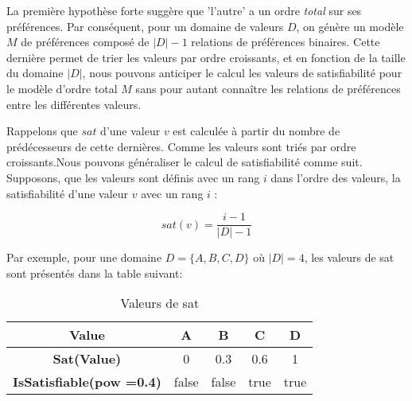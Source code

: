 \documentclass{llncs}
\begin{document}
	La première hypothèse forte suggère que 'l'autre' a un ordre \emph{total} sur ses préférences. Par conséquent, pour un domaine de valeurs $D$, on génère un modèle $M$ de préférences composé de $|D| -1$ relations de préférences binaires. Cette dernière permet de trier les valeurs par ordre croissants, et en fonction de la taille du domaine $|D|$, nous pouvons anticiper le calcul les valeurs de satisfiabilité pour le modèle d'ordre total $M$ sans pour autant connaître les relations de préférences entre les différentes valeurs.
	
	Rappelons que $sat$ d'une valeur $v$ est calculée à partir du nombre de prédécesseurs de cette dernières. Comme les valeurs sont triés par ordre croissants.Nous pouvons généraliser le calcul de satisfiabilité comme suit. Supposons, que les valeurs sont définis avec un rang $i$ dans l'ordre des valeurs, la satisfiabilité d'une valeur $v$ avec un rang $i$ :
	
	\begin{equation}
		sat(v) = \frac{i-1}{|D|-1}
	\end{equation} 
	
	Par exemple, pour une domaine $D =\{A, B, C, D\}$ où $|D| = 4$, les valeurs de sat sont présentés dans la table suivant: 
	
		\begin{table}[h]
			\centering
			\begin{tabular}{ |c|c|c|c|c| }
				\hline
				\textbf{Value}& \textbf{A} & \textbf{B} & \textbf{C}& \textbf{D} \\ 
				\hline
				\newline  \textbf{Sat(Value) }& 0 & 0.3 & 0.6 & 1\\ 
				\hline
				\newline  \textbf{IsSatisfiable(pow =0.4) }& false & false & true & true\\ 
				\hline
			\end{tabular}
			\caption{Valeurs de sat}
			\label{table:conditions}
		\end{table}
	
\end{document}
